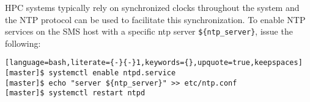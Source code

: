 HPC systems typically rely on synchronized clocks throughout the system and the
NTP protocol can be used to facilitate this synchronization.  To enable NTP
services on the SMS host with a specific ntp server \texttt{\$\{ntp\_server\}},
issue the following:

\begin{lstlisting}[language=bash,literate={-}{-}1,keywords={},upquote=true,keepspaces]
[master]$ systemctl enable ntpd.service
[master]$ echo "server ${ntp_server}" >> etc/ntp.conf
[master]$ systemctl restart ntpd
\end{lstlisting}
